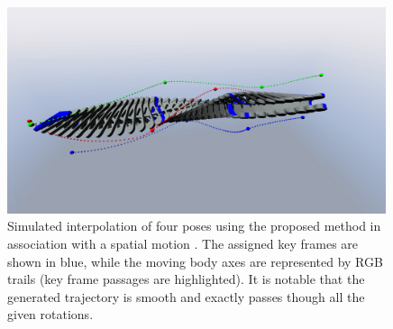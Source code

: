 \begin{figure}[tbp]
    \centering
    \includegraphics[trim=0 1cm 0 3cm,clip,width=0.99\textwidth]{figures/strobo_trail.PNG}
    \caption{Simulated interpolation of four poses using the proposed method in association with a spatial motion \cite{tasora2015chrono}. The assigned key frames are shown in blue, while the moving body axes are represented by RGB trails (key frame passages are highlighted). It is notable that the generated trajectory is smooth and exactly passes though all the given rotations.}
    \label{fig:strobo_trail}
\end{figure}

